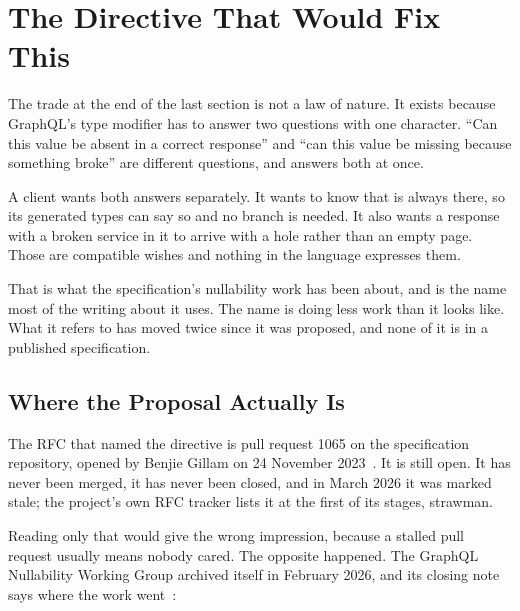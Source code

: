 \section{The Directive That Would Fix This}
\label{sec:ch14-the-directive-that-would-fix-this}

%
The trade at the end of the last section is not a law of nature. It exists
because GraphQL's type modifier has to answer two questions with one character.
\enquote{Can this value be absent in a correct response} and \enquote{can this
value be missing because something broke} are different questions, and \code{!}
answers both at once.

%
A client wants both answers separately. It wants to know that
 is always there, so its generated types can say so and no
branch is needed. It also wants a response with a broken service in it to arrive
with a hole rather than an empty page. Those are compatible wishes and nothing
in the language expresses them.

%
That is what the specification's nullability work has been about, and
 is the name most of the writing about it uses. The name
is doing less work than it looks like. What it refers to has moved twice since
it was proposed, and none of it is in a published specification.

\subsection{Where the Proposal Actually Is}

%
The RFC that named the directive is pull request 1065 on the specification
repository, opened by Benjie Gillam on 24 November
2023~\autocite{graphqlrfc1065}. It is still open. It has never been merged, it
has never been closed, and in March 2026 it was marked stale; the project's own
RFC tracker lists it at the first of its stages, strawman.

%
Reading only that would give the wrong impression, because a stalled pull
request usually means nobody cared. The opposite happened. The GraphQL
Nullability Working Group archived itself in February 2026, and its closing note
says where the work went~\autocite{nullabilitywg}:

